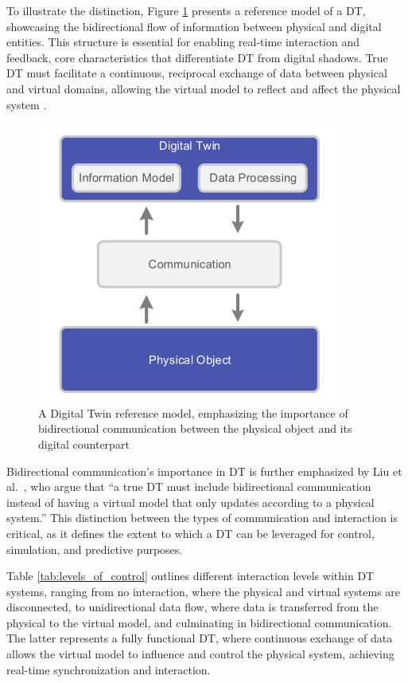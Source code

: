 To illustrate the distinction, Figure \ref{f:dt-structure} presents a reference model of a \ac{DT}, showcasing the bidirectional flow of information between physical and digital entities. This structure is essential for enabling real-time interaction and feedback, core characteristics that  differentiate \ac{DT} from digital shadows. True \ac{DT} must facilitate a continuous, reciprocal exchange of data between physical and virtual domains, allowing the virtual model to reflect and affect the physical system \cite{dt_model}.

\begin{figure}[!htpb]
    \centering
    \includegraphics[width=0.4\linewidth]{figs/dt_reference_model.png}
    \caption{A Digital Twin reference model, emphasizing the importance of bidirectional communication between the physical object and its digital counterpart~\cite{dt_model}}
    \label{f:dt-structure}
\end{figure}

Bidirectional communication's importance in \ac{DT} is further emphasized by Liu et al.~\cite{liu2022state}, who argue that “a true DT must include bidirectional communication instead of having a virtual model that only updates according to a physical system.” This distinction between the types of communication and interaction is critical, as it defines the extent to which a \ac{DT} can be leveraged for control, simulation, and predictive purposes.

Table \ref{tab:levels_of_control} outlines different interaction levels within \ac{DT} systems, ranging from no interaction, where the physical and virtual systems are disconnected, to unidirectional data flow, where data is transferred from the physical to the virtual model, and culminating in bidirectional communication. The latter represents a fully functional \ac{DT}, where continuous exchange of data allows the virtual model to influence and control the physical system, achieving real-time synchronization and interaction.


